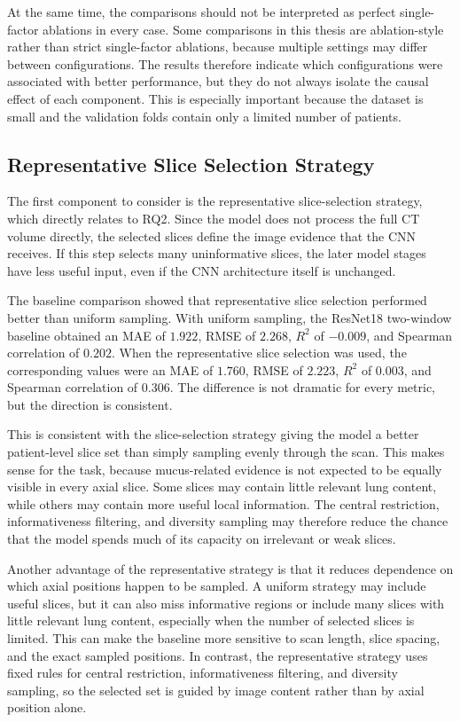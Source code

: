 At the same time, the comparisons should not be interpreted as perfect single-factor ablations in every case. Some comparisons in this thesis are ablation-style rather than strict single-factor ablations, because multiple settings may differ between configurations. The results therefore indicate which configurations were associated with better performance, but they do not always isolate the causal effect of each component. This is especially important because the dataset is small and the validation folds contain only a limited number of patients.


\subsection{Representative Slice Selection Strategy}
The first component to consider is the representative slice-selection strategy, which directly relates to RQ2. Since the model does not process the full CT volume directly, the selected slices define the image evidence that the CNN receives. If this step selects many uninformative slices, the later model stages have less useful input, even if the CNN architecture itself is unchanged.

The baseline comparison showed that representative slice selection performed better than uniform sampling. With uniform sampling, the ResNet18 two-window baseline obtained an MAE of \(1.922\), RMSE of \(2.268\), \(R^2\) of \(-0.009\), and Spearman correlation of \(0.202\). When the representative slice selection was used, the corresponding values were an MAE of \(1.760\), RMSE of \(2.223\), \(R^2\) of \(0.003\), and Spearman correlation of \(0.306\). The difference is not dramatic for every metric, but the direction is consistent.

This is consistent with the slice-selection strategy giving the model a better patient-level slice set than simply sampling evenly through the scan. This makes sense for the task, because mucus-related evidence is not expected to be equally visible in every axial slice. Some slices may contain little relevant lung content, while others may contain more useful local information. The central restriction, informativeness filtering, and diversity sampling may therefore reduce the chance that the model spends much of its capacity on irrelevant or weak slices.

Another advantage of the representative strategy is that it reduces dependence on which axial positions happen to be sampled. A uniform strategy may include useful slices, but it can also miss informative regions or include many slices with little relevant lung content, especially when the number of selected slices is limited. This can make the baseline more sensitive to scan length, slice spacing, and the exact sampled positions. In contrast, the representative strategy uses fixed rules for central restriction, informativeness filtering, and diversity sampling, so the selected set is guided by image content rather than by axial position alone.

